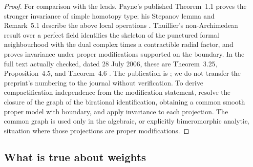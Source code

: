 \begin{proof}
For comparison with the leads, Payne's published Theorem~1.1 proves the stronger invariance of simple homotopy type; his Stepanov lemma and Remark~5.1 describe the above local operations \cite{Payne2013}.  Thuillier's non-Archimedean result over a perfect field identifies the skeleton of the punctured formal neighbourhood with the dual complex times a contractible radial factor, and proves invariance under proper modifications supported on the boundary.  In the full text actually checked, dated 28 July 2006, these are Theorem~3.25, Proposition~4.5, and Theorem~4.6 \cite{Thuillier2006}.  The publication is \cite{Thuillier2007}; we do not transfer the preprint's numbering to the journal without verification.  To derive compactification independence from the modification statement, resolve the closure of the graph of the birational identification, obtaining a common smooth proper model with boundary, and apply invariance to each projection.  The common graph is used only in the algebraic, or explicitly bimeromorphic analytic, situation where those projections are proper modifications.
\end{proof}

\subsection{What is true about weights}

